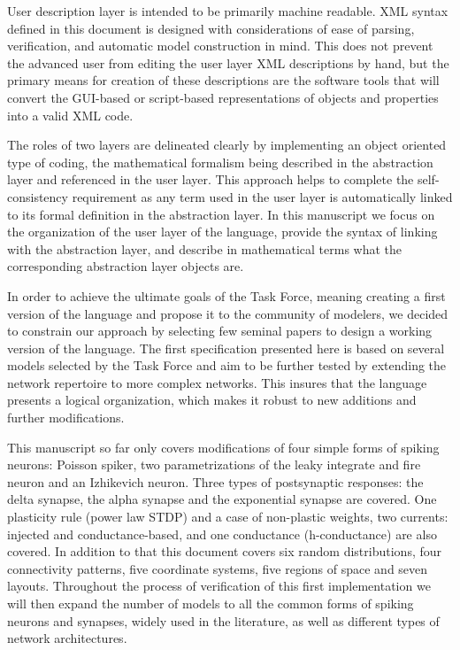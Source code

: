 \documentclass{article}
\begin{document}
User description layer is intended to be primarily machine readable. XML syntax
defined in this document is designed with considerations of ease of parsing,
verification, and automatic model construction in mind. This does not prevent the
advanced user from editing the user layer XML descriptions by hand, but the
primary means for creation of these descriptions are the software tools that
will convert the GUI-based or script-based representations of objects and
properties into a valid XML code.

The roles of two layers are delineated clearly by implementing an object oriented
type of coding, the mathematical formalism being described in the abstraction layer
and referenced in the user layer. This approach helps to complete
the self-consistency requirement as any term used in the user layer is automatically
linked to its formal definition in the abstraction layer. In this manuscript we focus
on the organization of the user layer of the language, provide the syntax of linking
with the abstraction layer, and describe in mathematical terms what the corresponding
abstraction layer objects are.

In order to achieve the ultimate goals of the Task Force, meaning creating a first
version of the language and propose it to the community of modelers, we decided
to constrain our approach by selecting few seminal papers to design a working
version of the language. The first specification presented here is based on
several models selected by the Task Force and aim to be further tested by extending
the network repertoire to more complex networks. This insures that the language
presents a logical organization, which makes it robust to new additions and further
modifications.

This manuscript so far only covers modifications of four simple forms of spiking
neurons: Poisson spiker, two parametrizations of the leaky integrate and fire neuron
and an Izhikevich neuron. Three types of postsynaptic responses: the delta synapse, the
alpha synapse and the exponential synapse are covered. One plasticity rule (power
law STDP) and a case of non-plastic weights, two currents: injected and
conductance-based, and one conductance (h-conductance) are also covered.
In addition to that this document covers six random distributions, four
connectivity patterns, five coordinate systems, five regions of space and seven
layouts. Throughout the process of verification of this
first implementation we will then expand the number of models to all the common
forms of spiking neurons and synapses, widely used in the literature, as well as
different types of network architectures.
\end{document}
